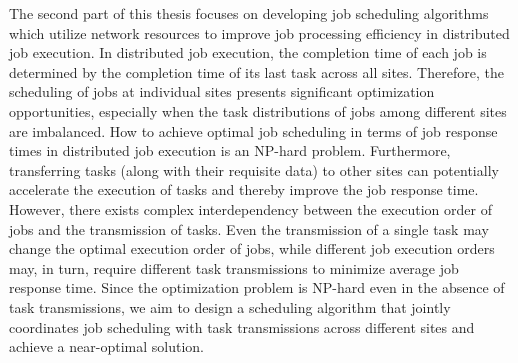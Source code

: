 The second part of this thesis focuses on developing job scheduling algorithms which utilize network resources to improve job processing efficiency in distributed job execution. In distributed job execution, the completion time of each job is determined by the completion time of its last task across all sites. Therefore, the scheduling of jobs at individual sites presents significant optimization opportunities, especially when the task distributions of jobs among different sites are imbalanced. How to achieve optimal job scheduling in terms of job response times in distributed job execution is an NP-hard problem. Furthermore, transferring tasks (along with their requisite data) to other sites can potentially accelerate the execution of tasks and thereby improve the job response time. However, there exists complex interdependency between the execution order of jobs and the transmission of tasks. Even the transmission of a single task may change the optimal execution order of jobs, while different job execution orders may, in turn, require different task transmissions to minimize average job response time. Since the optimization problem is NP-hard even in the absence of task transmissions, we aim to design a scheduling algorithm that jointly coordinates job scheduling with task transmissions across different sites and achieve a near-optimal solution.

